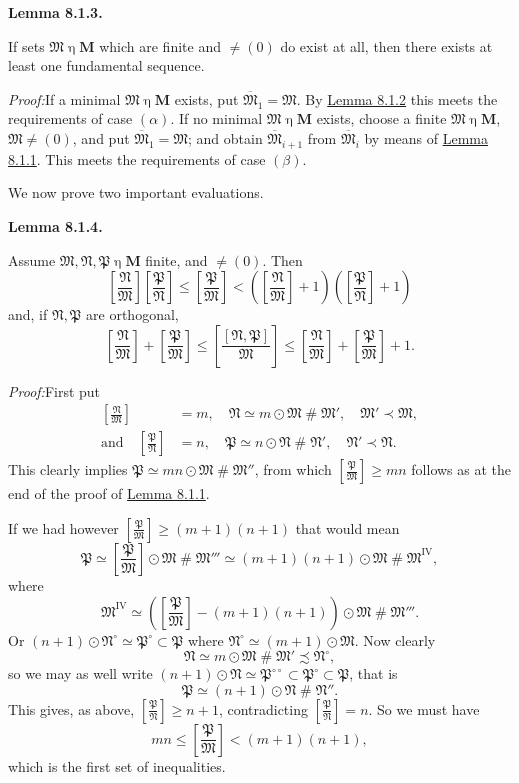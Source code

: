 \documentclass[12pt,b5paper,twoside]{article}
\newcommand{\M}{\mathbf M}
\newcommand{\reldiv}[2]{\left[\frac{#1}{#2}\right]}
\newcommand{\Lemma}[1]{%
  \par\smallskip\noindent\phantomsection\label{lem:#1}\textbf{Lemma #1.}\enspace
}
\newcommand{\Proof}{\par\noindent\textit{Proof:}\enspace}
\newcommand{\lemref}[1]{\hyperref[lem:#1]{Lemma #1}}
\begin{document}
\Lemma{8.1.3}
If sets $\mathfrak M\mathbin\eta\M$ which are finite and $\ne(0)$ do exist at
all, then there exists at least one fundamental sequence.

\Proof If a minimal $\mathfrak M\mathbin\eta\M$ exists, put
$\overline{\mathfrak M}_1=\mathfrak M$. By \lemref{8.1.2} this meets the
requirements of case $(\alpha)$. If no minimal $\mathfrak M\mathbin\eta\M$ exists,
choose a finite $\mathfrak M\mathbin\eta\M$, $\mathfrak M\ne(0)$, and put
$\overline{\mathfrak M}_1=\mathfrak M$; and obtain
$\overline{\mathfrak M}_{i+1}$ from $\overline{\mathfrak M}_i$ by means of
\lemref{8.1.1}. This meets the requirements of case $(\beta)$.

We now prove two important evaluations.

\Lemma{8.1.4}
Assume $\mathfrak M,\mathfrak N,\mathfrak P\mathbin\eta\M$ finite, and
$\ne(0)$. Then
\[
 \reldiv{\mathfrak N}{\mathfrak M}
 \reldiv{\mathfrak P}{\mathfrak N}
 \leq \reldiv{\mathfrak P}{\mathfrak M}
 <\left(\reldiv{\mathfrak N}{\mathfrak M}+1\right)
  \left(\reldiv{\mathfrak P}{\mathfrak N}+1\right)
\]
and, if $\mathfrak N,\mathfrak P$ are orthogonal,
\[
 \reldiv{\mathfrak N}{\mathfrak M}
 +\reldiv{\mathfrak P}{\mathfrak M}
 \leq\reldiv{[\mathfrak N,\mathfrak P]}{\mathfrak M}
 \leq\reldiv{\mathfrak N}{\mathfrak M}
 +\reldiv{\mathfrak P}{\mathfrak M}+1.
\]

\Proof First put
\[
 \begin{aligned}
 \reldiv{\mathfrak N}{\mathfrak M}&=m,
 \quad \mathfrak N\simeq m\odot\mathfrak M\mathbin{\#}\mathfrak M',
 \quad \mathfrak M'\prec\mathfrak M,\\
 \text{and}\quad \reldiv{\mathfrak P}{\mathfrak N}&=n,
 \quad \mathfrak P\simeq n\odot\mathfrak N\mathbin{\#}\mathfrak N',
 \quad \mathfrak N'\prec\mathfrak N.
 \end{aligned}
\]
This clearly implies
$\mathfrak P\simeq mn\odot\mathfrak M\mathbin{\#}\mathfrak M''$, from which
$\reldiv{\mathfrak P}{\mathfrak M}\geq mn$ follows as at the end of the proof
of \lemref{8.1.1}.

If we had however
$\reldiv{\mathfrak P}{\mathfrak M}\geq(m+1)(n+1)$ that would mean
\[
 \mathfrak P\simeq
 \reldiv{\mathfrak P}{\mathfrak M}\odot\mathfrak M
 \mathbin{\#}\mathfrak M'''
 \simeq(m+1)(n+1)\odot\mathfrak M\mathbin{\#}\mathfrak M^{\mathrm{IV}},
\]
where
\[
 \mathfrak M^{\mathrm{IV}}\simeq
 \left(\reldiv{\mathfrak P}{\mathfrak M}-(m+1)(n+1)\right)
 \odot\mathfrak M\mathbin{\#}\mathfrak M'''.
\]
Or $(n+1)\odot\mathfrak N^\circ\simeq\mathfrak P^\circ\subset\mathfrak P$
where $\mathfrak N^\circ\simeq(m+1)\odot\mathfrak M$. Now clearly
\[
 \mathfrak N\simeq m\odot\mathfrak M\mathbin{\#}\mathfrak M'
 \precsim\mathfrak N^\circ,
\]
so we may as well write
$(n+1)\odot\mathfrak N\simeq\mathfrak P^{\circ\circ}
\subset\mathfrak P^\circ\subset\mathfrak P$, that is
\[
 \mathfrak P\simeq(n+1)\odot\mathfrak N\mathbin{\#}\mathfrak N''.
\]
This gives, as above,
$\reldiv{\mathfrak P}{\mathfrak N}\geq n+1$, contradicting
$\reldiv{\mathfrak P}{\mathfrak N}=n$. So we must have
\[
 mn\leq\reldiv{\mathfrak P}{\mathfrak M}<(m+1)(n+1),
\]
which is the first set of inequalities.
\end{document}
